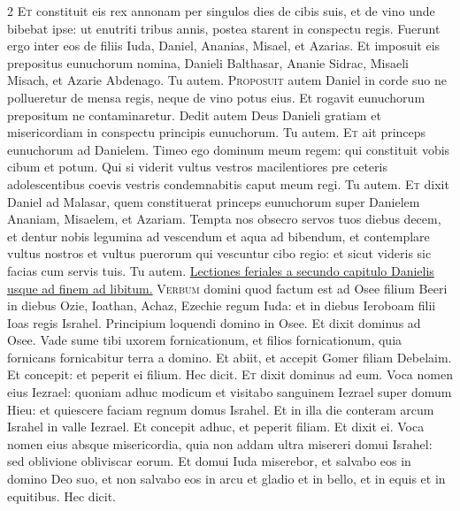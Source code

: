 \begin{multicols*}{2}
\lettrine[lines=2]{\zallmancaps \color{Red} E}{t} constituit eis rex annonam per singulos dies de cibis suis, et de vino unde bibebat ipse: ut enutriti tribus annis, postea starent in conspectu regis. Fuerunt ergo inter eos de filiis Iuda, Daniel, Ananias, Misael, et Azarias. Et imposuit eis prepositus eunuchorum nomina, Danieli Balthasar, Ananie Sidrac, Misaeli Misach, et Azarie Abdenago. Tu autem.
\lettrine[lines=2]{\zallmancaps \color{Blue} P}{roposuit} autem Daniel in corde suo ne pollueretur de mensa regis, neque de vino potus eius. Et rogavit eunuchorum prepositum ne contaminaretur. Dedit autem Deus Danieli gratiam et misericordiam in conspectu principis eunuchorum. Tu autem.
\lettrine[lines=2]{\zallmancaps \color{Red} E}{t} ait princeps eunuchorum ad Danielem. Timeo ego dominum meum regem: qui constituit vobis cibum et potum. Qui si viderit vultus vestros macilentiores pre ceteris adolescentibus coevis vestris condemnabitis caput meum regi. Tu autem.
\lettrine[lines=2]{\zallmancaps \color{Blue} E}{t} dixit Daniel ad Malasar, quem constituerat princeps eunuchorum super Danielem Ananiam, Misaelem, et Azariam. Tempta nos obsecro servos tuos diebus decem, et dentur nobis legumina ad vescendum et aqua ad bibendum, et contemplare vultus nostros et vultus puerorum qui vescuntur cibo regio: et sicut videris sic facias cum servis tuis. Tu autem.
\newline \ul{Lectiones feriales a secundo capitulo Danielis usque ad finem ad libitum.}
{\color{Red} }
\lettrine[lines=2]{\zallmancaps \color{Red} V}{erbum} domini quod factum est ad Osee filium Beeri in diebus Ozie, Ioathan, Achaz, Ezechie regum Iuda: et in diebus Ieroboam filii Ioas regis Israhel. Principium loquendi domino in Osee. Et dixit dominus ad Osee. Vade sume tibi uxorem fornicationum, et filios fornicationum, quia fornicans fornicabitur terra a domino. Et abiit, et accepit Gomer filiam Debelaim. Et concepit: et peperit ei filium. Hec dicit.
\lettrine[lines=2]{\zallmancaps \color{Blue} E}{t} dixit dominus ad eum. Voca nomen eius Iezrael: quoniam adhuc modicum et visitabo sanguinem Iezrael super domum Hieu: et quiescere faciam regnum domus Israhel. Et in illa die conteram arcum Israhel in valle Iezrael. Et concepit adhuc, et peperit filiam. Et dixit ei. Voca nomen eius absque misericordia, quia non addam ultra misereri domui Israhel: sed oblivione obliviscar eorum. Et domui Iuda miserebor, et salvabo eos in domino Deo suo, et non salvabo eos in arcu et gladio et in bello, et in equis et in equitibus. Hec dicit.

\end{multicols*}
